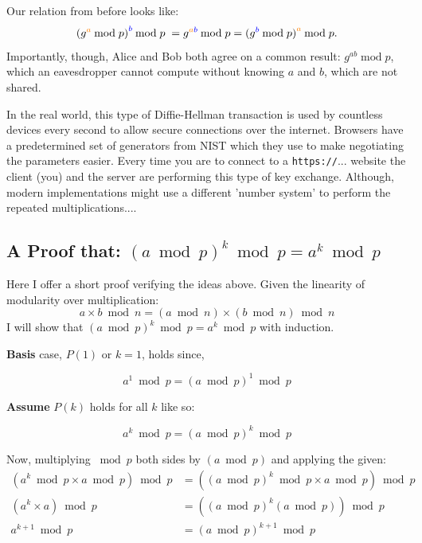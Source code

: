 \documentclass[11pt, a4paper]{report}
\begin{document}
Our relation from before looks like:
\[ (g^{\color{orange}{a}}\color{black}{\:\mathrm{mod}\; p)}^{\color{blue}{b}}\color{black}{\:\mathrm{mod}\; p\; =\; }g^{\color{orange}{a}\color{blue}{b}} \:\mathrm{mod}\; p = (g^{\color{blue}{b}}\color{black}{\:\mathrm{mod}\; p)}^{\color{orange}{a}} \color{black}{\:\mathrm{mod}\; p.}  \]
Importantly, though, Alice and Bob both agree on a common result: $g^{ab}\;\mathrm{mod}\;p$, which an eavesdropper cannot compute without knowing $a$ and $b$, which are not shared.

In the real world, this type of Diffie-Hellman transaction is used by countless devices every second to allow secure connections over the internet. Browsers have a predetermined set of generators from NIST which they use to make negotiating the parameters easier.\autocite{barker} Every time you are to connect to a \texttt{https://}... website the client (you) and the server are performing this type of key exchange. Although, modern implementations might use a different 'number system' to perform the repeated multiplications....

\subsection{A Proof that: $(a \bmod p)^k \bmod p = a^k \bmod p$}

Here I offer a short proof verifying the ideas above.
Given the linearity of modularity over multiplication:
$$a \times b \bmod n = (a \bmod n) \times (b \bmod n) \bmod n$$
I will show that $(a \bmod p)^k \bmod p = a^k \bmod p$ with induction.
\vspace*{0.4cm}

\textbf{Basis} case, $P(1)$ or $k=1$, holds since,

\[ a^1 \bmod p = (a \bmod p)^1 \bmod p \tag{basis}  \]

\textbf{Assume} $P(k)$ holds for all $k$ like so:

\[ a^k \bmod p = (a \bmod p)^k \bmod p \tag{P(k)} \]

Now, multiplying $ \bmod p$ both sides by $(a \bmod p)$ and applying the given:
\begin{align*}
\left(  a^k \bmod p \times a \bmod p \right) \bmod p &= \left(  (a \bmod p)^k \bmod p \times a \bmod p \right) \bmod p\\
(a^k \times a) \bmod p  &= ((a \bmod p)^k (a \bmod p)) \bmod p\\
a^{k+1} \bmod p  &= (a \bmod p)^{k+1} \bmod p \tag{P(k+1)}
\end{align*}
\end{document}
